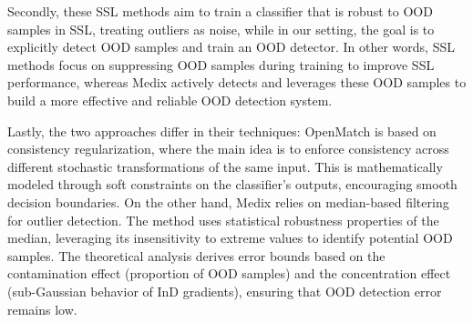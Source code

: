\documentclass[10pt]{article} %
\theoremstyle{plain}
\theoremstyle{definition}
\begin{document}
Secondly, these SSL methods aim to train a classifier that is robust to OOD samples in SSL, treating outliers as noise, while in our setting, the goal is to explicitly detect OOD samples and train an OOD detector. In other words, SSL methods focus on suppressing OOD samples during training to improve SSL performance, whereas Medix actively detects and leverages these OOD samples to build a more effective and reliable OOD detection system.

Lastly, the two approaches differ in their techniques: OpenMatch is based on consistency regularization, where the main idea is to enforce consistency across different stochastic transformations of the same input. This is mathematically modeled through soft constraints on the classifier’s outputs, encouraging smooth decision boundaries. On the other hand, Medix relies on median-based filtering for outlier detection. The method uses statistical robustness properties of the median, leveraging its insensitivity to extreme values to identify potential OOD samples. The theoretical analysis derives error bounds based on the contamination effect (proportion of OOD samples) and the concentration effect (sub-Gaussian behavior of InD gradients), ensuring that OOD detection error remains low.
\end{document}
